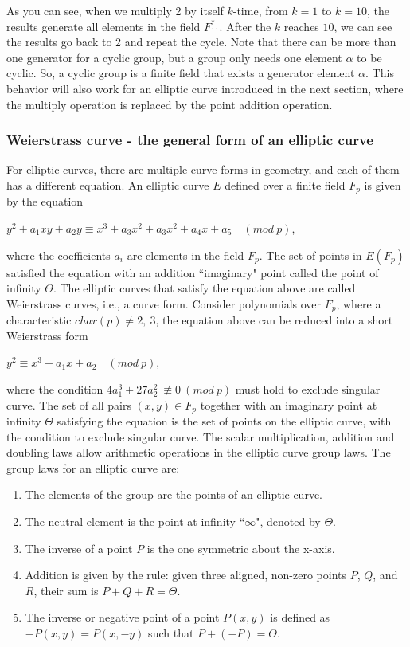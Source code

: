 As you can see, when we multiply 2 by itself $k$-time, from $k = 1$ to $k = 10$, the results generate all elements in the field $F_{11}^*$. After the $k$ reaches $10$, we can see the results go back to 2 and repeat the cycle. Note that there can be more than one generator for a cyclic group, but a group only needs one element $\alpha$ to be cyclic. So, a cyclic group is a finite field that exists a generator element $\alpha$. This behavior will also work for an elliptic curve introduced in the next section, where the multiply operation is replaced by the point addition operation.

\subsubsection{Weierstrass curve - the general form of an elliptic curve}
For elliptic curves, there are multiple curve forms in geometry, and each of them has a different equation. An elliptic curve $E$ defined over a finite field $F_p$ is given by the equation


\begin{center}
  $y^2 + a_1xy + a_2y \equiv x^3 + a_3x^2 + a_3x^2 + a_4x + a_5 \quad (mod \ p)$,\\
\end{center}


where the coefficients $a_i$ are elements in the field $F_p$. The set of points in $E(F_p)$ satisfied the equation with an addition ``imaginary" point called the point of infinity $\Theta$. The elliptic curves that satisfy the equation above are called Weierstrass curves, i.e., a curve form. Consider polynomials over $F_p$, where a characteristic $char(p) \neq 2, \ 3$, the equation above can be reduced into a short Weierstrass form


\begin{center}
  $y^2 \equiv x^3 + a_1x + a_2 \quad (mod \ p)$,
\end{center}


where the condition $4a_1^3 + 27a_2^2 \ \not\equiv 0 \ (mod \ p)$ must hold to exclude singular curve. The set of all pairs $(x,y) \in F_p$ together with an imaginary point at infinity $\Theta$ satisfying the equation is the set of points on the elliptic curve, with the condition to exclude singular curve. The scalar multiplication, addition and doubling laws allow arithmetic operations in the elliptic curve group laws. The group laws for an elliptic curve are:

\begin{enumerate}
  \item The elements of the group are the points of an elliptic curve.
  \item The neutral element is the point at infinity ``$\infty$", denoted by $\Theta$.
  \item The inverse of a point $P$ is the one symmetric about the x-axis.
  \item Addition is given by the rule: given three aligned, non-zero points $P$, $Q$, and $R$, their sum is $P + Q + R = \Theta$.
  \item The inverse or negative point of a point $P(x,y)$ is defined as $-P(x,y) = P(x,-y)$ such that $P + (-P) = \Theta$.
\end{enumerate}

